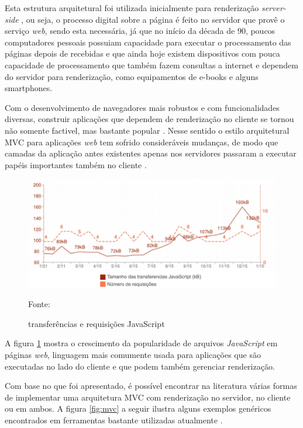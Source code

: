 Esta estrutura arquitetural foi utilizada inicialmente para renderização \textit{server-side} \cite{shabaitah2014}, ou seja, o processo digital sobre a página é feito no servidor que provê o serviço \textit{web}, sendo esta necessária, já que no início da década de 90, poucos computadores pessoais possuiam capacidade para executar o processamento das páginas depois de recebidas e que ainda hoje existem dispositivos com pouca capacidade de processamento que também fazem consultas a internet e dependem do servidor para renderização, como equipamentos de e-books e alguns smartphones\cite{baker2006}. 

Com o desenvolvimento de navegadores mais robustos e com funcionalidades diversas, construir aplicações que dependem de renderização no cliente se tornou não somente factivel, mas bastante popular \cite{google2015}. Nesse sentido o estilo arquitetural MVC para aplicações \textit{web} tem sofrido consideráveis mudanças, de modo que camadas da aplicação antes existentes apenas nos servidores passaram a executar papéis importantes também no cliente \cite{google2015}.

\begin{figure}[h!]
	\centering
  	\includegraphics[width=.9\linewidth]{figuras/jsdata.eps}
  	\caption{transferências e requisições JavaScript}
	\small{Fonte: \cite{google2015}}
  	\label{fig:jsdata}
\end{figure}

A figura \ref{fig:jsdata} mostra o crescimento da popularidade de arquivos \textit{JavaScript} em páginas \textit{web}, linguagem mais comumente usada para aplicações que são executadas no lado do cliente e que podem também gerenciar renderização. 

Com base no que foi apresentado, é possível encontrar na literatura várias formas de implementar uma arquitetura MVC com renderização no servidor, no cliente ou em ambos. A figura \ref{fig:mvc} a seguir ilustra alguns exemplos genéricos encontrados em ferramentas bastante utilizadas atualmente \cite{mejia2011, petitit2014, quinn2015}. 

